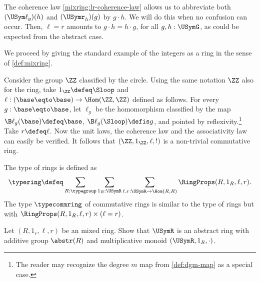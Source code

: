 The coherence law \ref{mixring:lr-coherence-law} allows us to abbreviate both 
$(\USym\ell_g)(h)$ and $(\USymr_h)(g)$ by $g\cdot h$. We will do this when
no confusion can occur. Then, $\ell=r$ 
amounts to $g\cdot h = h\cdot g$, for all $g,h : \USymG$,
as could be expected from the abstract case.

We proceed by giving the standard example of the integers as a ring
in the sense of \cref{def:mixring}.
\begin{example}
Consider the group $\ZZ$ classified by the circle.
Using the same notation $\ZZ$ also for the ring, take $1_\ZZ \defeq\Sloop$
and $\ell: (\base\eqto\base)\to\Hom(\ZZ,\ZZ)$ defined as follows.
For every $g:\base\eqto\base$, let $\ell_g$ be the homomorphism
classified by the map $\B\ell_g(\base)\defeq\base$, 
$\B\ell_g(\Sloop)\defis g$, and pointed by reflexivity.\footnote{%
The reader may recognize the degree $m$
map from \cref{def:dgm-map} as a special case.}
Take $r\defeq\ell$. Now the unit laws, the coherence law and
the associativity law can easily be verified. It follows that
$(\ZZ,1_\ZZ,\ell,!)$ is a non-trivial commutative ring.
\end{example}

\begin{definition}\label{def:typemixring}
The type of rings is defined as
\[
\typering\defeq\sum_{R:\typegroup}\sum_{1_R:\USymR}\sum_{\ell,r:\USymR\to\Hom(R,R)} \RingProps(R,1_R,\ell,r).
\]
The type $\typecommring$ of commutative rings is similar to the type
of rings but with $\RingProps(R,1_R,\ell,r) \times(\ell=r)$. 
\end{definition}

\begin{xca}\label{xca:Rmixring->URabstring}
Let $(R,1_r,\ell,r)$ be an mixed ring. 
Show that $\USymR$ is an abstract ring with
additive group $\abstr(R)$ and multiplicative 
monoid $(\USymR,1_R,\cdot)$. 
\end{xca}

